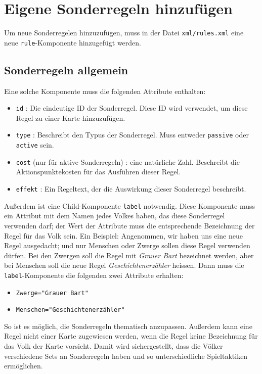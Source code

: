 \documentclass[a4paper,11pt]{report}
\begin{document}
\section{Eigene Sonderregeln hinzufügen}
Um neue Sonderregelen hinzuzufügen, muss in der Datei \verb+xml/rules.xml+ eine neue \verb+rule+-Komponente hinzugefügt werden.

\subsection{Sonderregeln allgemein}
Eine solche Komponente muss die folgenden Attribute enthalten:
\begin{itemize}
	\item \verb+id+ : Die eindeutige ID der Sonderregel. Diese ID wird verwendet, um diese Regel zu einer Karte hinzuzufügen.
	\item \verb+type+ : Beschreibt den Typus der Sonderregel. Muss entweder \verb+passive+ oder \verb+active+ sein.
	\item \verb+cost+ (nur für aktive Sonderregeln) : eine natürliche Zahl. Beschreibt die Aktionspunktekosten für das Ausführen dieser Regel.
	\item \verb+effekt+ : Ein Regeltext, der die Auswirkung dieser Sonderregel beschreibt.
\end{itemize}
Außerdem ist eine Child-Komponente \verb+label+ notwendig. Diese Komponente muss ein Attribut mit dem Namen jedes Volkes haben, das diese Sonderregel verwenden darf; der Wert der Attribute muss die entsprechende Bezeichnung der Regel für das Volk sein. Ein Beispiel: Angenommen, wir haben uns eine neue Regel ausgedacht; und nur Menschen oder Zwerge sollen diese Regel verwenden dürfen. Bei den Zwergen soll die Regel mit \emph{Grauer Bart} bezeichnet werden, aber bei Menschen soll die neue Regel \emph{Geschichtenerzähler} heissen. Dann muss die \verb+label+-Komponente die folgenden zwei Attribute erhalten:
\begin{itemize}
	\item \verb+Zwerge="Grauer Bart"+
	\item \verb+Menschen="Geschichtenerzähler"+
\end{itemize}
So ist es möglich, die Sonderregeln thematisch anzupassen. Außerdem kann eine Regel nicht einer Karte zugewiesen werden, wenn die Regel keine Bezeichnung für das Volk der Karte vorsieht. Damit wird sichergestellt, dass die Völker verschiedene Sets an Sonderregeln haben und so unterschiedliche Spieltaktiken ermöglichen.
\end{document}
